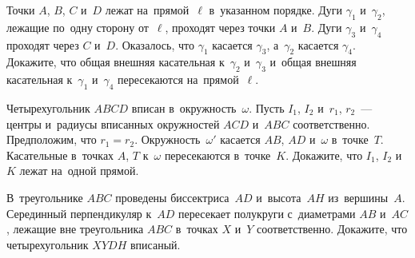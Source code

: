 \begin{problems}
\item
Точки $A$, $B$, $C$ и~$D$ лежат на~прямой~$\ell$ в~указанном порядке.
Дуги $\gamma_1$ и~$\gamma_2$, лежащие по~одну сторону от~$\ell$, проходят
через точки $A$ и~$B$.
Дуги $\gamma_3$ и~$\gamma_4$ проходят через $C$ и~$D$.
Оказалось, что $\gamma_1$ касается $\gamma_3$, а~$\gamma_2$ касается
$\gamma_4$.
Докажите, что общая внешняя касательная к~$\gamma_2$ и~$\gamma_3$ и~общая
внешняя касательная к~$\gamma_1$ и~$\gamma_4$
пересекаются на~прямой~$\ell$.

\item
Четырехугольник $ABCD$ вписан в~окружность~$\omega$.
Пусть $I_1$, $I_2$ и~$r_1$, $r_2$~--- центры и~радиусы вписанных
окружностей $ACD$ и~$ABC$ соответственно.
Предположим, что $r_1 = r_2$.
Окружность~$\omega'$ касается $AB$, $AD$ и~$\omega$ в~точке~$T$.
Касательные в~точках $A$, $T$ к~$\omega$ пересекаются в~точке~$K$.
Докажите, что $I_1$, $I_2$ и~$K$ лежат на~одной прямой.

\item
В~треугольнике $ABC$ проведены биссектриса~$AD$ и~высота~$AH$ из~вершины~$A$.
Серединный перпендикуляр к~$AD$ пересекает полукруги с~диаметрами $AB$ и~$AC$,
лежащие вне треугольника $ABC$ в~точках $X$ и~$Y$ соответственно.
Докажите, что четырехугольник $XYDH$ вписаный.

\end{problems}

